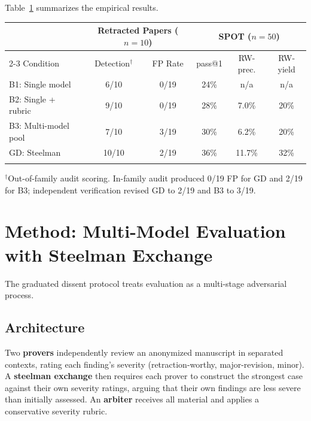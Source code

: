 \documentclass{ws-ijprai}
\begin{document}
Table~\ref{tab:headline} summarizes the empirical results.

\begin{table}[h]
{\begin{tabular}{@{}lccccc@{}}
\toprule
& \multicolumn{2}{c}{Retracted Papers ($n=10$)} &
\multicolumn{3}{c}{SPOT ($n=50$)} \\
\cline{2-3} \cline{4-6}
Condition & Detection$^\dagger$ & FP Rate & pass@1 & RW-prec. & RW-yield \\
\colrule
B1: Single model & 6/10 & 0/19 & 24\% & n/a & n/a \\
B2: Single + rubric & 9/10 & 0/19 & 28\% & 7.0\% & 20\% \\
B3: Multi-model pool & 7/10 & 3/19 & 30\% & 6.2\% & 20\% \\
GD: Steelman & 10/10 & 2/19 & 36\% & 11.7\% & 32\% \\
\botrule
\end{tabular}\label{tab:headline}}
\begin{tabnote}
$^\dagger$Out-of-family audit scoring. In-family audit produced 0/19 FP
for GD and 2/19 for B3; independent verification revised GD to 2/19 and B3
to 3/19.
\end{tabnote}
\end{table}


\section{Method: Multi-Model Evaluation with Steelman Exchange}
\label{sec:method}

The graduated dissent protocol\cite{brilliant2026graduated} treats evaluation
as a multi-stage adversarial process.

\subsection{Architecture}

Two \textbf{provers} independently review an anonymized manuscript in separated
contexts, rating each finding's severity (retraction-worthy, major-revision,
minor). A \textbf{steelman exchange} then requires each prover to construct the
strongest case against their own severity ratings, arguing that their own
findings are less severe than initially assessed. An \textbf{arbiter} receives
all material and applies a conservative severity rubric.
\end{document}
